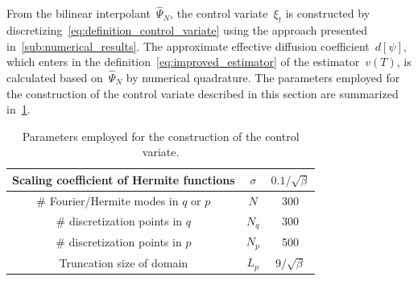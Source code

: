 \documentclass[11pt,a4paper]{article}
\begin{document}
From the bilinear interpolant~$\widehat \Psi_N$,
the control variate~$\xi_t$ is constructed by discretizing~\eqref{eq:definition_control_variate} using the approach presented in~\cref{sub:numerical_results}.
The approximate effective diffusion coefficient~$d[\psi]$,
which enters in the definition~\eqref{eq:improved_estimator} of the estimator~$v(T)$,
is calculated based on~$\widehat \Psi_N$ by numerical quadrature.
The parameters employed for the construction of the control variate described in this section are summarized in~\cref{table:parameters_employed_for_the_construction_of_the_control_variate}.
\begin{table}[ht]
    \centering
    \begin{tabular}{|c|c|c|}
        \hline
        Scaling coefficient of Hermite functions & $\sigma$ & $0.1/\sqrt{\beta}$ \\
        \hline
        \# Fourier/Hermite modes in $q$ or $p$ & $N$ & 300 \\
        \hline
        \# discretization points in $q$ & $N_q$ & 300 \\
        \hline
        \# discretization points in $p$ & $N_p$ & 500 \\
        \hline
        Truncation size of domain & $L_p$ & $9/\sqrt{\beta}$\\
        \hline
    \end{tabular}
    \caption{Parameters employed for the construction of the control variate.}
    \label{table:parameters_employed_for_the_construction_of_the_control_variate}
\end{table}
\end{document}
